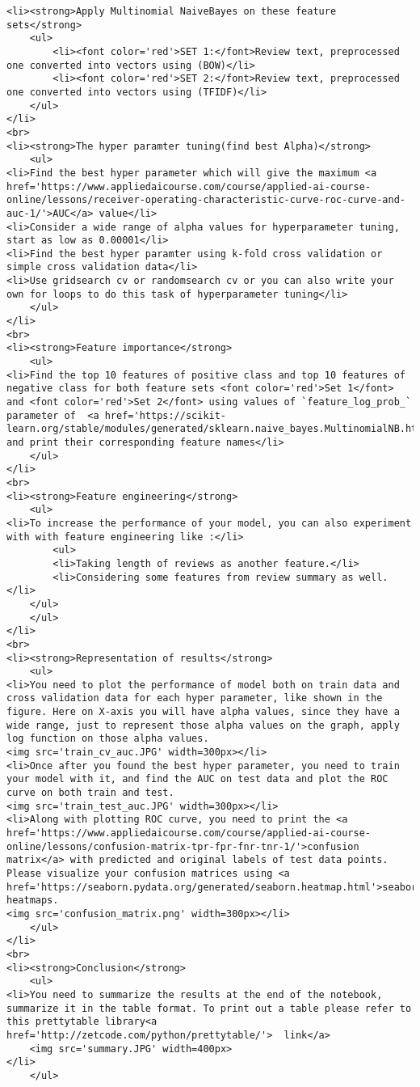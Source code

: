 \documentclass[11pt]{article}
\begin{document}
    \begin{verbatim}
<li><strong>Apply Multinomial NaiveBayes on these feature sets</strong>
    <ul>
        <li><font color='red'>SET 1:</font>Review text, preprocessed one converted into vectors using (BOW)</li>
        <li><font color='red'>SET 2:</font>Review text, preprocessed one converted into vectors using (TFIDF)</li>
    </ul>
</li>
<br>
<li><strong>The hyper paramter tuning(find best Alpha)</strong>
    <ul>
<li>Find the best hyper parameter which will give the maximum <a href='https://www.appliedaicourse.com/course/applied-ai-course-online/lessons/receiver-operating-characteristic-curve-roc-curve-and-auc-1/'>AUC</a> value</li>
<li>Consider a wide range of alpha values for hyperparameter tuning, start as low as 0.00001</li>
<li>Find the best hyper paramter using k-fold cross validation or simple cross validation data</li>
<li>Use gridsearch cv or randomsearch cv or you can also write your own for loops to do this task of hyperparameter tuning</li>
    </ul>
</li>
<br>
<li><strong>Feature importance</strong>
    <ul>
<li>Find the top 10 features of positive class and top 10 features of negative class for both feature sets <font color='red'>Set 1</font> and <font color='red'>Set 2</font> using values of `feature_log_prob_` parameter of  <a href='https://scikit-learn.org/stable/modules/generated/sklearn.naive_bayes.MultinomialNB.html'>MultinomialNB</a> and print their corresponding feature names</li>
    </ul>
</li>
<br>
<li><strong>Feature engineering</strong>
    <ul>
<li>To increase the performance of your model, you can also experiment with with feature engineering like :</li>
        <ul>
        <li>Taking length of reviews as another feature.</li>
        <li>Considering some features from review summary as well.</li>
    </ul>
    </ul>
</li>
<br>
<li><strong>Representation of results</strong>
    <ul>
<li>You need to plot the performance of model both on train data and cross validation data for each hyper parameter, like shown in the figure. Here on X-axis you will have alpha values, since they have a wide range, just to represent those alpha values on the graph, apply log function on those alpha values.
<img src='train_cv_auc.JPG' width=300px></li>
<li>Once after you found the best hyper parameter, you need to train your model with it, and find the AUC on test data and plot the ROC curve on both train and test.
<img src='train_test_auc.JPG' width=300px></li>
<li>Along with plotting ROC curve, you need to print the <a href='https://www.appliedaicourse.com/course/applied-ai-course-online/lessons/confusion-matrix-tpr-fpr-fnr-tnr-1/'>confusion matrix</a> with predicted and original labels of test data points. Please visualize your confusion matrices using <a href='https://seaborn.pydata.org/generated/seaborn.heatmap.html'>seaborn heatmaps.
<img src='confusion_matrix.png' width=300px></li>
    </ul>
</li>
<br>
<li><strong>Conclusion</strong>
    <ul>
<li>You need to summarize the results at the end of the notebook, summarize it in the table format. To print out a table please refer to this prettytable library<a href='http://zetcode.com/python/prettytable/'>  link</a> 
    <img src='summary.JPG' width=400px>
</li>
    </ul>
\end{verbatim}
\end{document}
